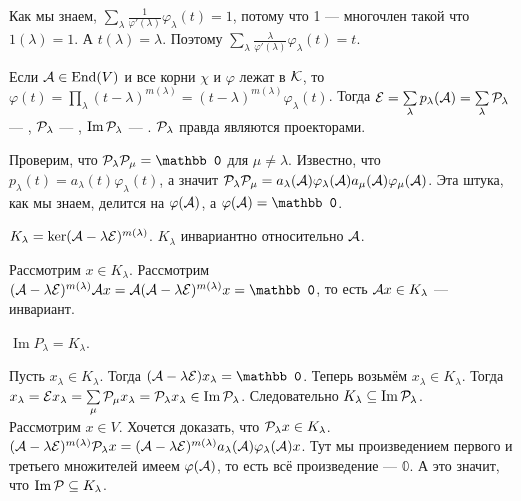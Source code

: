 \documentclass{article}
\DeclareMathOperator{\operIm}{Im}
\let\Im\operIm
\newcommand*{\id}{{\scriptE}}
\begin{document}
\begin{itemize}
\begin{Proof}
            Как мы знаем, $\sum\limits_\lambda\frac{1}{\varphi'(\lambda)}\varphi_\lambda(t)=1$, потому что 1 --- многочлен такой что $1(\lambda)=1$. А $t(\lambda)=\lambda$. Поэтому $\sum\limits_\lambda\frac{\lambda}{\varphi'(\lambda)}\varphi_\lambda(t)=t$.
        \end{Proof}
        \dfn Если ${\mathcal{A}}\in\operatorname{End}(V)$ и все корни $\chi$ и $\varphi$ лежат в ${\mathcal{K}}$, то $\varphi(t)=\prod\limits_\lambda(t-\lambda)^{m(\lambda)}=(t-\lambda)^{m(\lambda)}\varphi_\lambda(t)$. Тогда $\id=\sum\limits_\lambda p_\lambda(\scriptA)=\sum\limits_\lambda \scriptP_\lambda$ --- , ${\mathcal{P}}_\lambda$ --- , $\Im\scriptP_\lambda$ --- .
        \thm ${\mathcal{P}}_\lambda$ правда являются проекторами.
        \begin{Proof}
            Проверим, что $\scriptP_\lambda\scriptP_\mu=\mathbb0$ для $\mu\neq\lambda$. Известно, что $p_\lambda(t)=a_\lambda(t)\varphi_\lambda(t)$, а значит ${\mathcal{P}}_\lambda{\mathcal{P}}_\mu=a_\lambda({\mathcal{A}})\varphi_\lambda({\mathcal{A}})a_\mu({\mathcal{A}})\varphi_\mu({\mathcal{A}})$. Эта штука, как мы знаем, делится на $\varphi({\mathcal{A}})$, а $\varphi(\scriptA)=\mathbb0$.
        \end{Proof} 
        \dfn {} $K_\lambda=\ker(\scriptA-\lambda\id)^{m(\lambda)}$.
        \thm $K_\lambda$ инвариантно относительно ${\mathcal{A}}$.
        \begin{Proof}
            Рассмотрим $x\in K_\lambda$. Рассмотрим $(\scriptA-\lambda\id)^{m(\lambda)}\scriptA x=\scriptA(\scriptA-\lambda\id)^{m(\lambda)}x=\mathbb0$, то есть ${\mathcal{A}} x\in K_\lambda$ --- инвариант.
        \end{Proof}
        \thm $\Im P_\lambda=K_\lambda$.
        \begin{Proof}
            Пусть $x_\lambda\in K_\lambda$. Тогда $(\scriptA-\lambda\id)x_\lambda=\mathbb0$. Теперь возьмём $x_\lambda\in K_\lambda$. Тогда $x_\lambda=\id x_\lambda=\sum\limits_{\mu}\scriptP_\mu x_\lambda=\scriptP_\lambda x_\lambda\in\Im\scriptP_\lambda$. Следовательно $K_\lambda\subseteq\Im\scriptP_\lambda$.\\
            Рассмотрим $x\in V$. Хочется доказать, что ${\mathcal{P}}_\lambda x\in K_\lambda$. $(\scriptA-\lambda\id)^{m(\lambda)}\scriptP_\lambda x=(\scriptA-\lambda\id)^{m(\lambda)}a_\lambda(\scriptA)\varphi_\lambda(\scriptA)x$. Тут мы произведением первого и третьего множителей имеем $\varphi({\mathcal{A}})$, то есть всё произведение --- $\mathbb0$. А это значит, что $\Im\scriptP\subseteq K_\lambda$.

\end{Proof}
\end{itemize}
\end{document}
